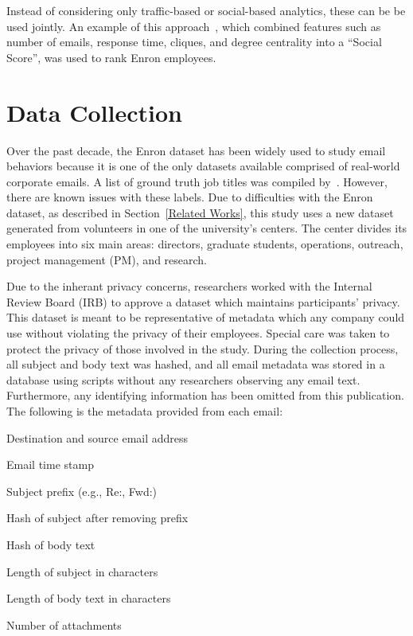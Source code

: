 \documentclass{article}
\begin{document}
Instead of considering only traffic-based or social-based analytics, these can be be used jointly.  An example of this approach~\cite{rowe_automated_2007}, which combined features such as number of emails, response time, cliques, and degree centrality into a ``Social Score'', was used to rank Enron employees.  

\section{Data Collection} \label{Data Collection}

Over the past decade, the Enron dataset has been widely used to study email behaviors because it is one of the only datasets available comprised of real-world corporate emails.  A list of ground truth job titles was compiled by~\cite{shetty_status_2004}.  However, there are known issues with these labels.  Due to difficulties with the Enron dataset, as described in Section~\ref{Related Works}, this study uses a new dataset generated from volunteers in one of the university's centers.  The center divides its employees into six main areas: directors, graduate students, operations, outreach, project management (PM), and research.

Due to the inherant privacy concerns, researchers worked with the Internal Review Board (IRB) to approve a dataset which maintains participants' privacy.  This dataset is meant to be representative of metadata which any company could use without violating the privacy of their employees.  Special care was taken to protect the privacy of those involved in the study.  During the collection process, all subject and body text was hashed, and all email metadata was stored in a database using scripts without any researchers observing any email text. Furthermore, any identifying information has been omitted from this publication.
The following is the metadata provided from each email:
\begin{compactitem}
\item Destination and source email address
\item Email time stamp
\item Subject prefix (e.g., Re:, Fwd:)
\item Hash of subject after removing prefix
\item Hash of body text
\item Length of subject in characters
\item Length of body text in characters
\item Number of attachments
\end{compactitem}
\end{document}
